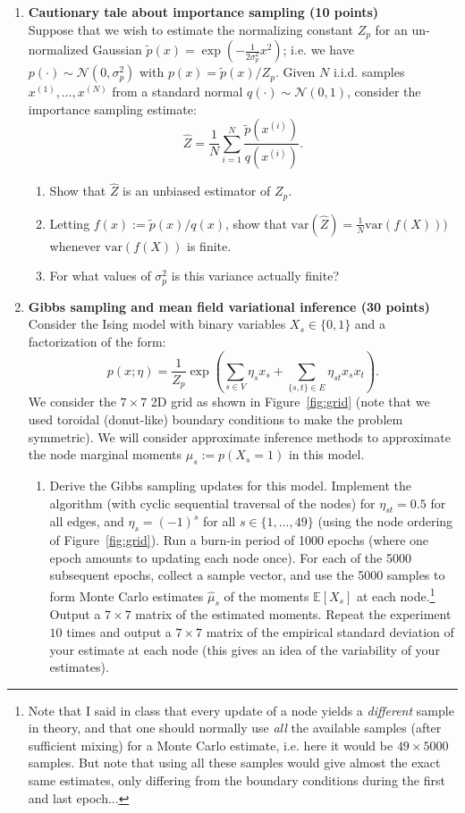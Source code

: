 \documentclass[12pt]{article}
\newcommand{\1}{{\bf 1}}
\newcommand{\E}{\mathbb{E}}
\begin{document}
\begin{enumerate}
\item {\bf Cautionary tale about importance sampling (10 points)} \\
Suppose that we wish to estimate the normalizing constant $Z_p$ for an un-normalized Gaussian $\tilde{p}(x) = \exp(-\frac{1}{2\sigma_p^2} x^2)$; i.e. we have $p(\cdot) \sim \mathcal{N}(0,\sigma_p^2)$ with $p(x) = \tilde{p}(x)/Z_p$. Given $N$ i.i.d. samples $x^{(1)},\ldots, x^{(N)}$ from a standard normal $q(\cdot) \sim \mathcal{N}(0,1)$, consider the importance sampling estimate:
$$
\hat{Z} = \frac{1}{N} \sum_{i=1}^N \frac{\tilde{p}(x^{(i)})} {q(x^{(i)})}.
$$
\begin{enumerate}
\item Show that $\hat{Z}$ is an unbiased estimator of $Z_p$.
\item Letting $f(x) := \tilde{p}(x)/q(x)$, show that $\text{var}(\hat{Z}) = \frac{1}{N} \text{var}(f(X)))$ whenever $\text{var}(f(X))$ is finite.
\item For what values of $\sigma_p^2$ is this variance actually finite?
\end{enumerate}


\vspace{1cm}
\item {\bf Gibbs sampling and mean field variational inference (30 points)} \\
Consider the Ising model with binary variables $X_s \in \{0,1\}$ and a factorization of the form:
$$
p(x; \eta) = \frac{1}{Z_p} \exp \left( \sum_{s \in V} \eta_s x_s + \sum_{\{s,t\} \in E} \eta_{st} x_s x_t \right).
$$
We consider the $7 \times 7$ 2D grid as shown in Figure~\ref{fig:grid} (note that we used toroidal (donut-like) boundary conditions to make the problem symmetric). We will consider approximate inference methods to approximate the node marginal moments $\mu_s := p(X_s = 1)$ in this model.

\begin{enumerate}
\item Derive the Gibbs sampling updates for this model. Implement the algorithm (with cyclic sequential traversal of the nodes) for $\eta_{st} = 0.5$ for all edges, and $\eta_s = (-1)^s$ for all $s \in \{1, \ldots, 49\}$ (using the node ordering of Figure~\ref{fig:grid}). Run a burn-in period of 1000 epochs (where one epoch amounts to updating each node once). For each of the 5000 subsequent epochs, collect a sample vector, and use the 5000 samples to form Monte Carlo estimates $\hat{\mu}_s$ of the moments $\E[X_s]$ at each node.\footnote{Note that I said in class that every update of a node yields a \emph{different} sample in theory, and that one should normally use \emph{all} the available samples (after sufficient mixing) for a Monte Carlo estimate, i.e. here it would be $49 \times 5000$ samples. But note that using all these samples would give almost the exact same estimates, only differing from the boundary conditions during the first and last epoch...}
Output a $7 \times 7$ matrix of the estimated moments.
Repeat the experiment $10$ times and output a $7 \times 7$ matrix of the empirical standard deviation of your estimate at each node (this gives an idea of the variability of your estimates).


\end{enumerate}
\end{enumerate}
\end{document}
